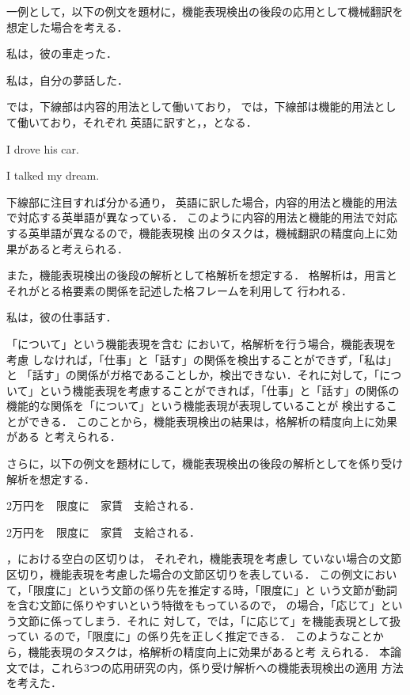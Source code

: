 \documentclass[japanese]{jnlp_1.3e}
\renewcommand{\underline}[1]{}
\begin{document}
一例として，以下の例文を題材に，機能表現検出の後段の応用として機械翻訳を
想定した場合を考える．
\begin{example}
 \item 私は，彼の車\underline{について}走った．\label{ex:nitsuite-C}
 \item 私は，自分の夢\underline{について}話した．\label{ex:nitsuite-F}
\end{example}
では，下線部は内容的用法として働いており，
では，下線部は機能的用法として働いており，それぞれ
英語に訳すと，，となる．
\begin{example}
 \item I drove \underline{\mbox{following}} his car.\label{ex:nitsuite-C-e}
 \item I talked \underline{about} my dream.\label{ex:nitsuite-F-e}
\end{example}
下線部に注目すれば分かる通り，
英語に訳した場合，内容的用法と機能的用法で対応する英単語が異なっている．
このように内容的用法と機能的用法で対応する英単語が異なるので，機能表現検
出のタスクは，機械翻訳の精度向上に効果があると考えられる．

また，機能表現検出の後段の解析として格解析を想定する．
格解析は，用言とそれがとる格要素の関係を記述した格フレームを利用して
行われる．
\begin{example}
 \item 私は，彼の仕事\underline{について}話す．\label{ex:nitsuite-k}
\end{example}
「について」という機能表現を含む
において，格解析を行う場合，機能表現を考慮
しなければ，「仕事」と「話す」の関係を検出することができず，「私は」と
「話す」の関係がガ格であることしか，検出できない．それに対して，「につ
いて」という機能表現を考慮することができれば，「仕事」と「話す」の関係の
機能的な関係を「について」という機能表現が表現していることが
検出することができる．
このことから，機能表現検出の結果は，格解析の精度向上に効果がある
と考えられる．

さらに，以下の例文を題材にして，機能表現検出の後段の解析としてを係り受け
解析を想定する．
\begin{example}
 \item 2万円を\ \ 限度に\ \ 家賃\underline{に　応じて}\ \ 支給される．\label{ex:niouzite-1}
 \item 2万円を\ \ 限度に\ \ 家賃\underline{に応じて}\ \ 支給される．\label{ex:niouzite-2}
\end{example}
，における空白の区切りは，
それぞれ，機能表現を考慮し
ていない場合の文節区切り，機能表現を考慮した場合の文節区切りを表している．
この例文において，「限度に」という文節の係り先を推定する時，「限度に」と
いう文節が動詞を含む文節に係りやすいという特徴をもっているので，
の場合，「応じて」という文節に係ってしまう．それに
対して，では，「に応じて」を機能表現として扱ってい
るので，「限度に」の係り先を正しく推定できる．
このようなことから，機能表現のタスクは，格解析の精度向上に効果があると考
えられる．
本論文では，これら3つの応用研究の内，係り受け解析への機能表現検出の適用
方法を考えた．
\end{document}
